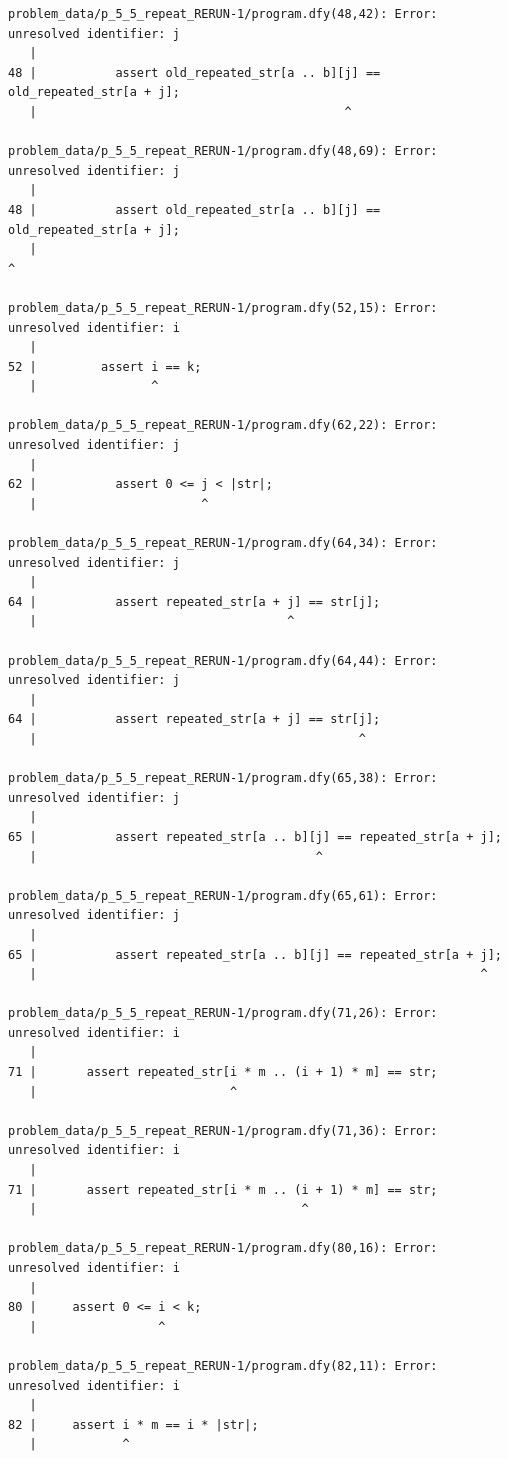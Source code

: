 \documentclass{article}
\begin{document}
\begin{lstlisting}
problem_data/p_5_5_repeat_RERUN-1/program.dfy(48,42): Error: unresolved identifier: j
   |
48 |           assert old_repeated_str[a .. b][j] == old_repeated_str[a + j];
   |                                           ^

problem_data/p_5_5_repeat_RERUN-1/program.dfy(48,69): Error: unresolved identifier: j
   |
48 |           assert old_repeated_str[a .. b][j] == old_repeated_str[a + j];
   |                                                                      ^

problem_data/p_5_5_repeat_RERUN-1/program.dfy(52,15): Error: unresolved identifier: i
   |
52 |         assert i == k;
   |                ^

problem_data/p_5_5_repeat_RERUN-1/program.dfy(62,22): Error: unresolved identifier: j
   |
62 |           assert 0 <= j < |str|;
   |                       ^

problem_data/p_5_5_repeat_RERUN-1/program.dfy(64,34): Error: unresolved identifier: j
   |
64 |           assert repeated_str[a + j] == str[j];
   |                                   ^

problem_data/p_5_5_repeat_RERUN-1/program.dfy(64,44): Error: unresolved identifier: j
   |
64 |           assert repeated_str[a + j] == str[j];
   |                                             ^

problem_data/p_5_5_repeat_RERUN-1/program.dfy(65,38): Error: unresolved identifier: j
   |
65 |           assert repeated_str[a .. b][j] == repeated_str[a + j];
   |                                       ^

problem_data/p_5_5_repeat_RERUN-1/program.dfy(65,61): Error: unresolved identifier: j
   |
65 |           assert repeated_str[a .. b][j] == repeated_str[a + j];
   |                                                              ^

problem_data/p_5_5_repeat_RERUN-1/program.dfy(71,26): Error: unresolved identifier: i
   |
71 |       assert repeated_str[i * m .. (i + 1) * m] == str;
   |                           ^

problem_data/p_5_5_repeat_RERUN-1/program.dfy(71,36): Error: unresolved identifier: i
   |
71 |       assert repeated_str[i * m .. (i + 1) * m] == str;
   |                                     ^

problem_data/p_5_5_repeat_RERUN-1/program.dfy(80,16): Error: unresolved identifier: i
   |
80 |     assert 0 <= i < k;
   |                 ^

problem_data/p_5_5_repeat_RERUN-1/program.dfy(82,11): Error: unresolved identifier: i
   |
82 |     assert i * m == i * |str|;
   |            ^


\end{lstlisting}
\end{document}
